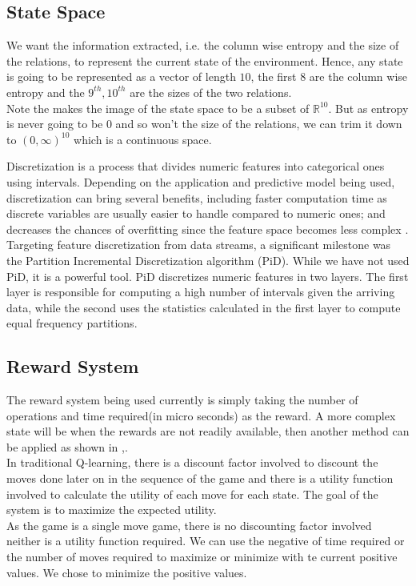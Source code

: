 \subsection{State Space}
We want the information extracted, i.e. the column wise entropy and the size of the relations, to represent the current state of the environment. Hence, any state is going to be represented as a vector of length $10$, the first $8$ are the column wise entropy and the $9^{th},10^{th}$ are the sizes of the two relations.\\
Note the makes the image of the state space to be a subset of $\mathbb{R}^{10}$. But as entropy is never going to be $0$ and so won't the size of the relations, we can trim it down to $(0,\infty)^{10}$ which is a continuous space.
\par Discretization is a process that divides numeric features into categorical  ones  using  intervals.   Depending  on  the  application and predictive model being used, discretization can bring several benefits, including faster computation time as discrete variables are usually easier to handle compared to numeric ones; and decreases the chances of overfitting since the feature space becomes less complex\cite{DNN_for_stream} . Targeting feature discretization from data streams, a significant milestone was the Partition Incremental Discretization algorithm (PiD)\cite{Pinto2005PartitionID}. While we have not used PiD, it is a powerful tool. PiD discretizes numeric features in two  layers.   The  first  layer  is  responsible  for  computing  a high number of intervals given the arriving data, while the second uses the statistics calculated in the first layer to compute equal frequency partitions.

\subsection{Reward System}
The reward system being used currently is simply taking the number of operations and time required(in micro seconds) as the reward. A more complex state will be when the rewards are not readily available, then another method can be applied as shown in \cite{know_unknown_rewards},\cite{DRL_rewards_problem}.\\
In traditional Q-learning, there is a discount factor involved to discount the moves done later on in the sequence of the game and there is a utility function involved to calculate the utility of each move for each state. The goal of the system is to maximize the expected utility.\\
As the game is a single move game, there is no discounting factor involved neither is a utility function required. We can use the negative of time required or the number of moves required to maximize or minimize with te current positive values. We chose to minimize the positive values.

